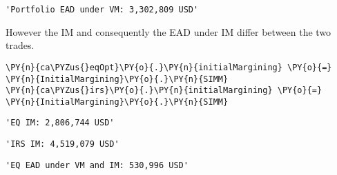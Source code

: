             \begin{tcolorbox}[breakable, size=fbox, boxrule=.5pt, pad at break*=1mm, opacityfill=0]
\begin{Verbatim}[commandchars=\\\{\}]
'Portfolio EAD under VM: 3,302,809 USD'
\end{Verbatim}
\end{tcolorbox}
        
    However the IM and consequently the EAD under IM differ between the two
trades.

    \begin{tcolorbox}[breakable, size=fbox, boxrule=1pt, pad at break*=1mm,colback=cellbackground, colframe=cellborder]
\begin{Verbatim}[commandchars=\\\{\}]
\PY{n}{ca\PYZus{}eqOpt}\PY{o}{.}\PY{n}{initialMargining} \PY{o}{=} \PY{n}{InitialMargining}\PY{o}{.}\PY{n}{SIMM}
\PY{n}{ca\PYZus{}irs}\PY{o}{.}\PY{n}{initialMargining} \PY{o}{=} \PY{n}{InitialMargining}\PY{o}{.}\PY{n}{SIMM}
\end{Verbatim}
\end{tcolorbox}

            \begin{tcolorbox}[breakable, size=fbox, boxrule=.5pt, pad at break*=1mm, opacityfill=0]
\begin{Verbatim}[commandchars=\\\{\}]
'EQ IM: 2,806,744 USD'
\end{Verbatim}
\end{tcolorbox}
        
            \begin{tcolorbox}[breakable, size=fbox, boxrule=.5pt, pad at break*=1mm, opacityfill=0]
\begin{Verbatim}[commandchars=\\\{\}]
'IRS IM: 4,519,079 USD'
\end{Verbatim}
\end{tcolorbox}
        
            \begin{tcolorbox}[breakable, size=fbox, boxrule=.5pt, pad at break*=1mm, opacityfill=0]
\begin{Verbatim}[commandchars=\\\{\}]
'EQ EAD under VM and IM: 530,996 USD'
\end{Verbatim}
\end{tcolorbox}
        
